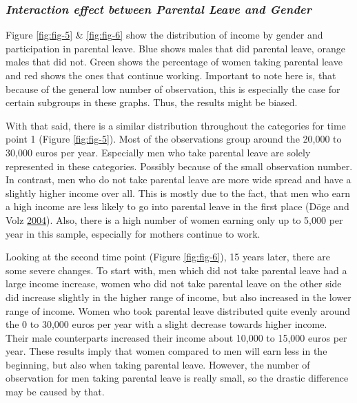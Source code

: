 \documentclass[
  12pt,
]{article}
\begin{document}
\hypertarget{interaction-effect-between-parental-leave-and-gender}{%
\subsubsection*{\texorpdfstring{\emph{Interaction effect between Parental Leave and Gender}}{Interaction effect between Parental Leave and Gender}}\label{interaction-effect-between-parental-leave-and-gender}}

Figure \ref{fig:fig-5} \& \ref{fig:fig-6} show the distribution of income by gender and participation in parental leave. Blue shows males that did parental leave, orange males that did not. Green shows the percentage of women taking parental leave and red shows the ones that continue working.
Important to note here is, that because of the general low number of observation, this is especially the case for certain subgroups in these graphs. Thus, the results might be biased.

With that said, there is a similar distribution throughout the categories for time point 1 (Figure \ref{fig:fig-5}). Most of the observations group around the 20,000 to 30,000 euros per year. Especially men who take parental leave are solely represented in these categories. Possibly because of the small observation number. In contrast, men who do not take parental leave are more wide spread and have a slightly higher income over all. This is mostly due to the fact, that men who earn a high income are less likely to go into parental leave in the first place (Döge and Volz \protect\hyperlink{ref-doge_manner_2004}{2004}). Also, there is a high number of women earning only up to 5,000 per year in this sample, especially for mothers continue to work.

Looking at the second time point (Figure \ref{fig:fig-6}), 15 years later, there are some severe changes. To start with, men which did not take parental leave had a large income increase, women who did not take parental leave on the other side did increase slightly in the higher range of income, but also increased in the lower range of income. Women who took parental leave distributed quite evenly around the 0 to 30,000 euros per year with a slight decrease towards higher income. Their male counterparts increased their income about 10,000 to 15,000 euros per year. These results imply that women compared to men will earn less in the beginning, but also when taking parental leave. However, the number of observation for men taking parental leave is really small, so the drastic difference may be caused by that.
\end{document}
